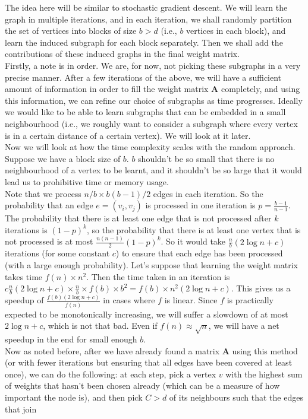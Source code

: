 \documentclass[a4paper]{article}
\newcommand{\nl}{\vspace{0.2cm}\\}
\newcommand{\mf}{\mathbf}
\begin{document}
The idea here will be similar to stochastic gradient descent. We will learn the graph in multiple iterations, and in each iteration, we shall randomly partition the set of vertices into blocks of size
$b > d$ (i.e., $b$ vertices in each block), and learn the induced subgraph for each block separately. Then we shall add the contributions of these induced graphs in the final weight matrix.\nl
Firstly, a note is in order. We are, for now, not picking these subgraphs in a very precise manner. After a few iterations of the above, we will have a sufficient amount of information in order to
fill the weight matrix $\mf{A}$ completely, and using this information, we can refine our choice of subgraphs as time progresses. Ideally we would like to be able to learn subgraphs that can be
embedded in a small neighbourhood (i.e., we roughly want to consider a subgraph where every vertex is in a certain distance of a certain vertex). We will look at it later.\nl
Now we will look at how the time complexity scales with the random approach.\nl
Suppose we have a block size of $b$. $b$ shouldn't be so small that there is no neighbourhood of a vertex to be learnt, and it shouldn't be so large that it would lead us to prohibitive time
or memory usage.\nl
Note that we process $n/b \times b(b - 1)/2$ edges in each iteration. So the probability that an edge $e = (v_i, v_j)$ is processed in one iteration is $p = \frac{b - 1}{n - 1}$. The probability
that there is at least one edge that is not processed after $k$ iterations is $(1 - p)^k$, so the probability that there is at least one vertex that is not processed is at most $\frac{n(n - 1)}{2}
(1 - p)^k$. So it would take
$\frac{n}{b} (2 \log n + c)$ iterations (for some constant $c$) to ensure that each edge has been processed (with a large enough probability). Let's suppose that learning the weight matrix takes time $f(n) \times n^2$. Then the time taken in an iteration
is $c \frac{n}{b} (2 \log n + c) \times \frac{n}{b} \times f(b) \times b^2 = f(b) \times n^2 (2 \log n + c)$. This gives us a speedup of $\frac{f(b) (2 \log n + c)}{f(n)}$ in cases where $f$ is linear. Since $f$ is
practically expected to be monotonically increasing, we will suffer a slowdown of at most $2 \log n + c$, which is not that bad. Even if $f(n) \approx \sqrt{n}$, we will have a net speedup in the
end for small enough $b$.\nl
Now as noted before, after we have already found a matrix $\mf{A}$ using this method (or with fewer iterations but ensuring that all edges have been covered at least once), we can do the
following: at each step, pick a vertex $v$ with the highest sum of weights that hasn't been chosen already (which can be a measure of how important the node is), and then pick $C > d$ of its neighbours such that the edges that join
\end{document}
